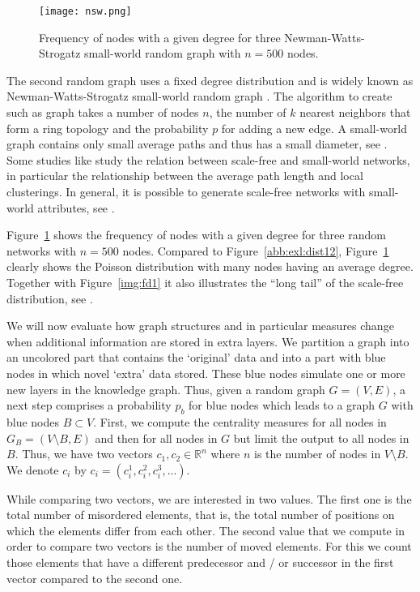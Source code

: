 \begin{figure}[t] %
	\centering
	\texttt{[image: nsw.png]}
	\caption{Frequency of nodes with a given degree for three Newman-Watts-Strogatz small-world random graph with $n=500$ nodes. }
	\label{img:fd2}
\end{figure}

The second random graph uses a fixed degree distribution and is widely known as Newman-Watts-Strogatz small-world random graph \cite{NEWMAN1999341}. The algorithm to create such as graph takes a number of nodes $n$, the number of $k$ nearest neighbors that form a ring topology and the probability  $p$ for adding a new edge. A small-world graph contains only small average paths and thus has a small diameter, see \cite{Jackson2010}. Some studies like \cite{aarstad2013ways} study the relation between scale-free and small-world networks, in particular the relationship between the average path length and local clusterings. In general, it is possible to generate scale-free networks with small-world attributes, see \cite{klemm2002growing}.

Figure~\ref{img:fd2} shows the frequency of nodes with a given degree for three random networks with $n=500$ nodes. Compared to Figure~\ref{abb:exl:dist12}, 
Figure~\ref{img:fd2} clearly shows the Poisson distribution with many nodes having an average degree. Together with Figure~\ref{img:fd1} it also illustrates the ``long tail'' of the scale-free distribution, see \cite{Jackson2010}. 

We will now evaluate how graph structures and in particular measures change when additional information are stored in extra layers. 
We partition a graph into an uncolored part that contains the `original' data and into a part with blue nodes in which novel `extra' data stored. 
These blue nodes simulate one or more new layers in the knowledge graph.
Thus, given a random graph $G=(V,E)$, a next step comprises a probability $p_b$ for blue nodes which leads to a graph $G$ with blue nodes $B\subset V$. 
First, we compute the centrality measures for all nodes in $G_B = (V\setminus B, E)$ and then for all nodes in $G$ but limit the output to all nodes in $B$. 
Thus, we have two vectors $c_1, c_2\in \mathbb{R}^n$ where $n$ is the number of nodes in $V\setminus B$. 
We denote $c_i$ by $c_i = \left( c_i^1, c_i^2, c_i^3, ...\right)$.
 
While comparing two vectors, we are interested in two values. 
The first one is the total number of misordered elements, that is, 
the total number of positions on which the elements differ from each other. 
The second value that we compute in order to compare two vectors 
is the number of moved elements. 
For this we count those elements that have a different predecessor and / or successor in the first vector compared to the second one.   

